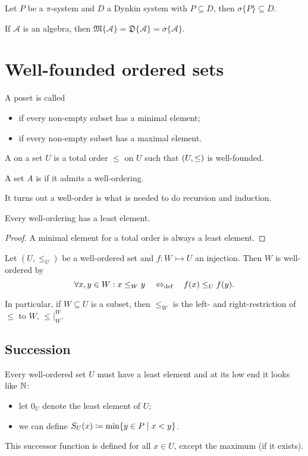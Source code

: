 \begin{corollary} \label{corollary:piLambdaTheorem}
Let $P$ be a $\pi$-system and $D$ a Dynkin system with $P\subseteq D$, then $\sigma\{P\} \subseteq D$.
\end{corollary}
\begin{corollary}
If $\mathcal{A}$ is an algebra, then $\mathfrak{M}\{\mathcal{A}\} = \mathfrak{D}\{\mathcal{A}\} = \sigma\{\mathcal{A}\}$.
\end{corollary}




\chapter{Well-founded ordered sets}
\begin{definition}
A poset is called
\begin{itemize}
\item {} if every non-empty subset has a minimal element;
\item {} if every non-empty subset has a maximal element.
\end{itemize}

A  on a set $U$ is a total order $\leq$ on $U$ such that $\left( U,\leq \right)$ is well-founded.

A set $A$ is  if it admits a well-ordering.
\end{definition}
It turns out a well-order is what is needed to do recursion and induction.

\begin{lemma}
Every well-ordering has a least element.
\end{lemma}
\begin{proof}
A minimal element for a total order is always a least element.
\end{proof}

\begin{lemma} \label{lemma:wellOrderingSubsets}
Let $(U,\leq_U)$ be a well-ordered set and $f: W \rightarrowtail U$ an injection. Then $W$ is well-ordered by
\[ \forall x,y\in W: x\leq_W y \quad\Leftrightarrow_{\text{def}}\quad f(x) \leq_U f(y). \]


In particular, if $W\subseteq U$ is a subset, then $\leq_W$ is the left- and right-restriction of $\leq$ to $W$, $\leq|_W^W$.
\end{lemma}

\section{Succession}
Every well-ordered set $U$ must have a least element and at its low end it looks like $\mathbb{N}$:
\begin{itemize}
\item let $0_U$ denote the least element of $U$;
\item we can define $S_U(x) \coloneqq \min\{y\in P\;|\;x<y\}$.
\end{itemize}
This successor function is defined for all $x\in U$, except the maximum (if it exists).

